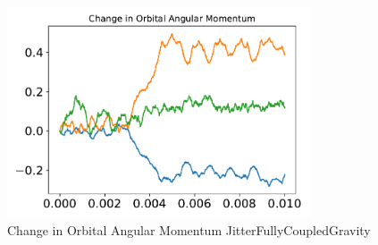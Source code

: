 \begin{figure}[htbp]\centerline{\includegraphics[width=0.80\textwidth]{AutoTeX/ChangeInOrbitalAngularMomentumJitterFullyCoupledGravity}}\caption{Change in Orbital Angular Momentum JitterFullyCoupledGravity}\label{fig:ChangeInOrbitalAngularMomentumJitterFullyCoupledGravity}\end{figure}